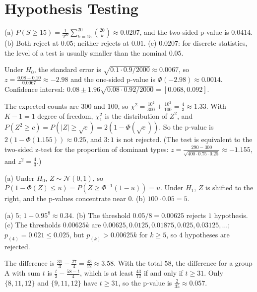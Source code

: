 \documentclass[11pt]{article}
\begin{document}
\section*{Hypothesis Testing}

\begin{description}[leftmargin=0pt, itemsep=0.3em]
    \item[\ref{pr:coin-test}.] (a) $P(S \geq 15) = \frac{1}{2^{20}}\sum_{k=15}^{20}\binom{20}{k} \approx 0.0207$, and the two-sided p-value is $0.0414$. (b) Both reject at $0.05$; neither rejects at $0.01$. (c) $0.0207$: for discrete statistics, the level of a test is usually smaller than the nominal $0.05$.
    \item[\ref{pr:error-test}.] Under $H_0$, the standard error is $\sqrt{0.1 \cdot 0.9/2000} \approx 0.0067$, so $z = \frac{0.08 - 0.10}{0.0067} \approx -2.98$ and the one-sided p-value is $\Phi(-2.98) \approx 0.0014$. Confidence interval: $0.08 \pm 1.96\sqrt{0.08 \cdot 0.92/2000} = [0.068, 0.092]$.
    \item[\ref{pr:chi-square}.] The expected counts are $300$ and $100$, so $\chi^2 = \frac{10^2}{300} + \frac{10^2}{100} = \frac{4}{3} \approx 1.33$. With $K - 1 = 1$ degree of freedom, $\chi^2_1$ is the distribution of $Z^2$, and $P(Z^2 \geq c) = P(|Z| \geq \sqrt{c}) = 2(1 - \Phi(\sqrt{c}))$. So the p-value is $2(1 - \Phi(1.155)) \approx 0.25$, and $3 : 1$ is not rejected. (The test is equivalent to the two-sided z-test for the proportion of dominant types: $z = \frac{290 - 300}{\sqrt{400 \cdot 0.75 \cdot 0.25}} \approx -1.155$, and $z^2 = \frac{4}{3}$.)
    \item[\ref{pr:pvalue-dist}.] (a) Under $H_0$, $Z \sim \mathcal{N}(0, 1)$, so $P(1 - \Phi(Z) \leq u) = P(Z \geq \Phi^{-1}(1 - u)) = u$. Under $H_1$, $Z$ is shifted to the right, and the p-values concentrate near $0$. (b) $100 \cdot 0.05 = 5$.
    \item[\ref{pr:multiple}.] (a) $5$; $1 - 0.95^8 \approx 0.34$. (b) The threshold $0.05/8 = 0.00625$ rejects $1$ hypothesis. (c) The thresholds $0.00625k$ are $0.00625, 0.0125, 0.01875, 0.025, 0.03125, \ldots$; $p_{(4)} = 0.021 \leq 0.025$, but $p_{(k)} > 0.00625k$ for $k \geq 5$, so $4$ hypotheses are rejected.
    \item[\ref{pr:permutation}.] The difference is $\frac{31}{3} - \frac{27}{4} = \frac{43}{12} \approx 3.58$. With the total $58$, the difference for a group A with sum $t$ is $\frac{t}{3} - \frac{58 - t}{4}$, which is at least $\frac{43}{12}$ if and only if $t \geq 31$. Only $\{8, 11, 12\}$ and $\{9, 11, 12\}$ have $t \geq 31$, so the p-value is $\frac{2}{35} \approx 0.057$.

\end{description}
\end{document}
